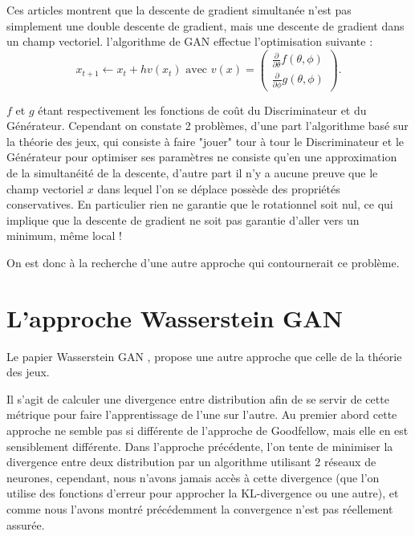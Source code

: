 Ces articles montrent que la descente de gradient simultanée n'est pas simplement une double descente de gradient, mais une descente de gradient dans un champ vectoriel. l'algorithme de GAN effectue l'optimisation suivante : 
\[x_{t+1} \leftarrow x_t + h v(x_t) \text{ avec } v(x) = \left(\begin{matrix}\frac{\partial}{\partial\theta}f(\theta, \phi)\\\frac{\partial}{\partial\phi}g(\theta, \phi)\end{matrix}\right).\]

$f$ et $g$ étant respectivement les fonctions de coût du Discriminateur et du Générateur. Cependant on constate 2 problèmes, d'une part l'algorithme basé sur la théorie des jeux, qui consiste à faire "jouer" tour à tour le Discriminateur et le Générateur pour optimiser ses paramètres ne consiste qu'en une approximation de la simultanéité de la descente, d'autre part il n'y a aucune preuve que le champ vectoriel $x$ dans lequel l'on se déplace possède des propriétés conservatives. En particulier rien ne garantie que le rotationnel soit nul, ce qui implique que la descente de gradient ne soit pas garantie d'aller vers un minimum, même local !


On est donc à la recherche d'une autre approche qui contournerait ce problème.



\section{L'approche Wasserstein GAN}

Le papier Wasserstein GAN \cite{arjovsky_wasserstein_2017}, propose une autre approche que celle de la théorie des jeux.

Il s'agit de calculer une divergence entre distribution afin de se servir de cette métrique pour faire l'apprentissage de l'une sur l'autre. Au premier abord cette approche ne semble pas si différente de l'approche de Goodfellow, mais elle en est sensiblement différente. Dans l'approche précédente, l'on tente de minimiser la divergence entre deux distribution par un algorithme utilisant 2 réseaux de neurones, cependant, nous n'avons jamais accès à cette divergence (que l'on utilise des fonctions d'erreur pour approcher la KL-divergence ou une autre), et comme nous l'avons montré précédemment la convergence n'est pas réellement assurée. 

